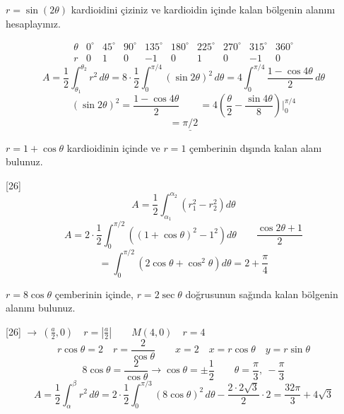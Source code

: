 \documentclass[11pt,a4paper]{article}
\begin{document}
\begin{ornek}
$r=\sin(2\theta)$ kardioidini çiziniz ve kardioidin içinde kalan bölgenin alanını hesaplayınız.
\end{ornek}
\[ \begin{array}{c|ccccccccc} \theta & 0^\circ & 45^\circ & 90^\circ & 135^\circ & 180^\circ & 225^\circ & 270^\circ & 315^\circ & 360^\circ\\\hline r & 0 & 1 & 0 & -1 & 0 & 1 & 0 & -1 & 0\end{array} \]
\[ A=\frac12\int_{\theta_1}^{\theta_2}r^2\,d\theta=8\cdot\frac12\int_0^{\pi/4}(\sin2\theta)^2\,d\theta=4\int_0^{\pi/4}\frac{1-\cos4\theta}{2}\,d\theta \]
\[ (\sin2\theta)^2=\frac{1-\cos4\theta}{2}\qquad =4\left(\frac\theta2-\frac{\sin4\theta}{8}\right)\Big|_0^{\pi/4} \]
\[ =\underline{\pi/2} \]

\begin{ornek}
$r=1+\cos\theta$ kardioidinin içinde ve $r=1$ çemberinin dışında kalan alanı bulunuz.
\end{ornek}
[26]
\[ A=\frac12\int_{\alpha_1}^{\alpha_2}\left(r_1^2-r_2^2\right)d\theta \]
\[ A=2\cdot\frac12\int_0^{\pi/2}\left((1+\cos\theta)^2-1^2\right)d\theta\qquad \frac{\cos2\theta+1}{2} \]
\[ =\int_0^{\pi/2}\left(2\cos\theta+\cos^2\theta\right)d\theta=2+\frac\pi4 \]

\begin{ornek}
$r=8\cos\theta$ çemberinin içinde, $r=2\sec\theta$ doğrusunun sağında kalan bölgenin alanını bulunuz.
\end{ornek}
[26]
$\longrightarrow\ \left(\tfrac a2,0\right)\quad r=\left|\tfrac a2\right|\qquad M(4,0)\quad r=4$
\[ r\cos\theta=2\quad r=\frac{2}{\cos\theta}\qquad x=2\quad x=r\cos\theta\quad y=r\sin\theta \]
\[ 8\cos\theta=\frac{2}{\cos\theta}\longrightarrow\cos\theta=\pm\frac12\qquad \theta=\frac\pi3,\ -\frac\pi3 \]
\[ A=\frac12\int_\alpha^\beta r^2\,d\theta=2\cdot\frac12\int_0^{\pi/3}(8\cos\theta)^2\,d\theta-\frac{2\cdot2\sqrt3}{2}\cdot2=\frac{32\pi}{3}+4\sqrt3 \]

\end{document}
